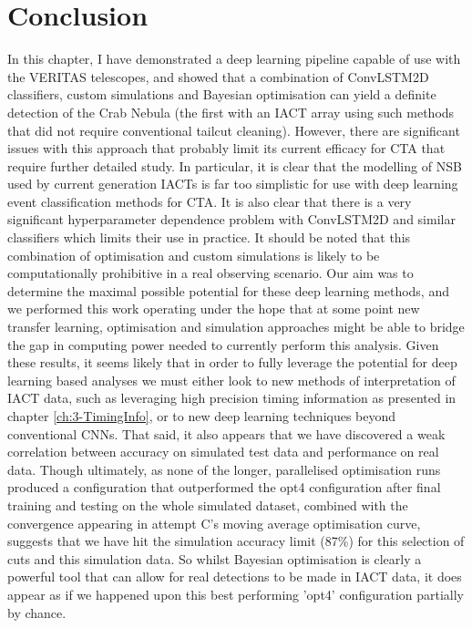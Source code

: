 \section{Conclusion}
In this chapter, I have demonstrated a deep learning pipeline capable of use with the VERITAS telescopes, and showed that a combination of ConvLSTM2D classifiers, custom simulations and Bayesian optimisation can yield a definite detection of the Crab Nebula (the first with an IACT array using such methods that did not require conventional tailcut cleaning). However, there are significant issues with this approach that probably limit its current efficacy for CTA that require further detailed study. In particular, it is clear that the modelling of NSB used by current generation IACTs is far too simplistic for use with deep learning event classification methods for CTA. It is also clear that there is a very significant hyperparameter dependence problem with ConvLSTM2D and similar classifiers which limits their use in practice. It should be noted that this combination of optimisation and custom simulations is likely to be computationally prohibitive in a real observing scenario. Our aim was to determine the maximal possible potential for these deep learning methods, and we performed this work operating under the hope that at some point new transfer learning, optimisation and simulation approaches might be able to bridge the gap in computing power needed to currently perform this analysis. Given these results, it seems likely that in order to fully leverage the potential for deep learning based analyses we must either look to new methods of interpretation of IACT data, such as leveraging high precision timing information as presented in chapter \ref{ch:3-TimingInfo}, or to new deep learning techniques beyond conventional CNNs. That said, it also appears that we have discovered a weak correlation between accuracy on simulated test data and performance on real data.
Though ultimately, as none of the longer, parallelised optimisation runs produced a configuration that outperformed the opt4 configuration after final training and testing on the whole simulated dataset, combined with the convergence appearing in attempt C's moving average optimisation curve, suggests that we have hit the simulation accuracy limit (87\%) for this selection of cuts and this simulation data. So whilst Bayesian optimisation is clearly a powerful tool that can allow for real detections to be made in IACT data, it does appear as if we happened upon this best performing 'opt4' configuration partially by chance.